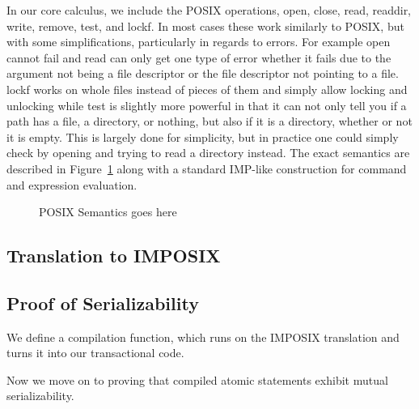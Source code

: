 In our core calculus, we include the POSIX operations,
open, close, read, readdir, write, remove, test, and lockf.
In most cases these work similarly to POSIX, but with some simplifications,
particularly in regards to errors. For example open cannot fail and
read can only get one type of error whether it fails due to the argument
not being a file descriptor or the file descriptor not pointing to a file.
lockf works on whole files instead of pieces of them and simply allow 
locking and unlocking while test is slightly more powerful in that it
can not only tell you if a path has a file, a directory, or nothing,
but also if it is a directory, whether or not it is empty. 
This is largely done for simplicity, but in practice one could
simply check by opening and trying to read a directory instead. The
exact semantics are described in Figure~\ref{fig:posix-semantics}
along with a standard IMP-like construction for command and
expression evaluation.

\begin{figure}
\caption{POSIX Semantics goes here}
\label{fig:posix-semantics}
\end{figure}

\subsection{Translation to IMPOSIX}
\label{subsec:posix-translation}



\subsection{Proof of Serializability}
\label{subsec:posix-proof}

We define a compilation function, which runs on the IMPOSIX translation
and turns it into our transactional code.



Now we move on to proving that compiled atomic statements exhibit mutual
serializability.

